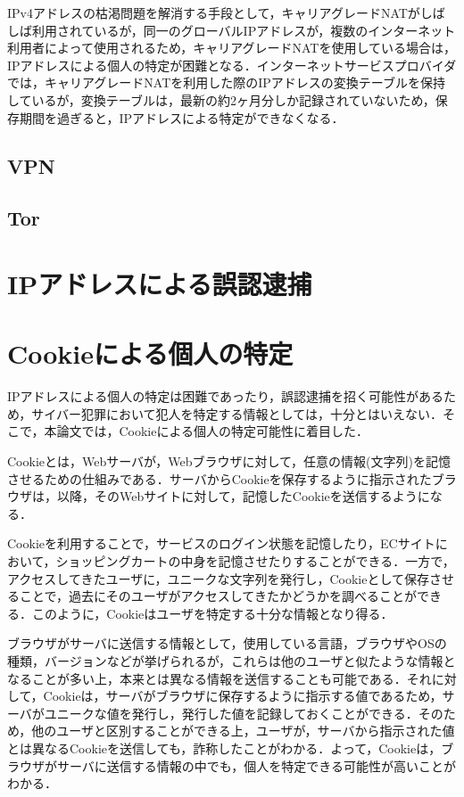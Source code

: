 \documentclass[10pt, a4paper]{jreport}
\begin{document}
IPv4アドレスの枯渇問題を解消する手段として，キャリアグレードNATがしばしば利用されているが，同一のグローバルIPアドレスが，複数のインターネット利用者によって使用されるため，キャリアグレードNATを使用している場合は，IPアドレスによる個人の特定が困難となる．インターネットサービスプロバイダでは，キャリアグレードNATを利用した際のIPアドレスの変換テーブルを保持しているが，変換テーブルは，最新の約2ヶ月分しか記録されていないため，保存期間を過ぎると，IPアドレスによる特定ができなくなる．

\subsection{VPN}

\subsection{Tor}

\section{IPアドレスによる誤認逮捕}

\section{Cookieによる個人の特定}
IPアドレスによる個人の特定は困難であったり，誤認逮捕を招く可能性があるため，サイバー犯罪において犯人を特定する情報としては，十分とはいえない．そこで，本論文では，Cookieによる個人の特定可能性に着目した．

Cookieとは，Webサーバが，Webブラウザに対して，任意の情報(文字列)を記憶させるための仕組みである．サーバからCookieを保存するように指示されたブラウザは，以降，そのWebサイトに対して，記憶したCookieを送信するようになる．

Cookieを利用することで，サービスのログイン状態を記憶したり，ECサイトにおいて，ショッピングカートの中身を記憶させたりすることができる．一方で，アクセスしてきたユーザに，ユニークな文字列を発行し，Cookieとして保存させることで，過去にそのユーザがアクセスしてきたかどうかを調べることができる．このように，Cookieはユーザを特定する十分な情報となり得る．

ブラウザがサーバに送信する情報として，使用している言語，ブラウザやOSの種類，バージョンなどが挙げられるが，これらは他のユーザと似たような情報となることが多い上，本来とは異なる情報を送信することも可能である．それに対して，Cookieは，サーバがブラウザに保存するように指示する値であるため，サーバがユニークな値を発行し，発行した値を記録しておくことができる．そのため，他のユーザと区別することができる上，ユーザが，サーバから指示された値とは異なるCookieを送信しても，詐称したことがわかる．よって，Cookieは，ブラウザがサーバに送信する情報の中でも，個人を特定できる可能性が高いことがわかる．
\end{document}
